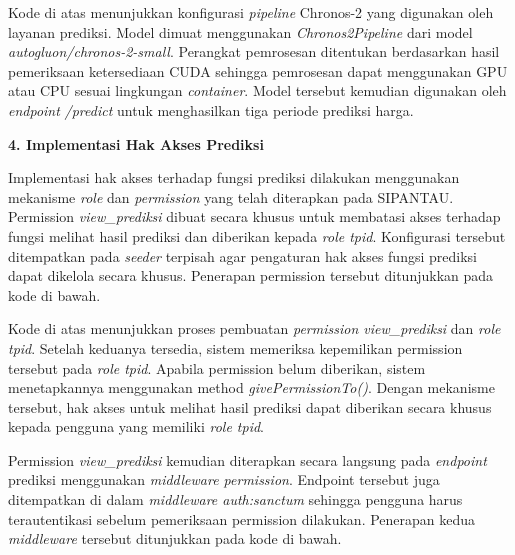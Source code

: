 Kode di atas menunjukkan konfigurasi \textit{pipeline} Chronos-2 yang digunakan oleh layanan prediksi. Model dimuat menggunakan \textit{Chronos2Pipeline} dari model \textit{autogluon/chronos-2-small}. Perangkat pemrosesan ditentukan berdasarkan hasil pemeriksaan ketersediaan CUDA sehingga pemrosesan dapat menggunakan GPU atau CPU sesuai lingkungan \textit{container}. Model tersebut kemudian digunakan oleh \textit{endpoint} \textit{/predict} untuk menghasilkan tiga periode prediksi harga.

\vspace{0.5em}
\noindent\textbf{4. Implementasi Hak Akses Prediksi}
\vspace{0.5em}

Implementasi hak akses terhadap fungsi prediksi dilakukan menggunakan mekanisme \textit{role} dan \textit{permission} yang telah diterapkan pada SIPANTAU. Permission \textit{view\_prediksi} dibuat secara khusus untuk membatasi akses terhadap fungsi melihat hasil prediksi dan diberikan kepada \textit{role tpid}. Konfigurasi tersebut ditempatkan pada \textit{seeder} terpisah agar pengaturan hak akses fungsi prediksi dapat dikelola secara khusus. Penerapan permission tersebut ditunjukkan pada kode di bawah.

\begin{code}
\end{code}

Kode di atas menunjukkan proses pembuatan \textit{permission view\_prediksi} dan \textit{role tpid}. Setelah keduanya tersedia, sistem memeriksa kepemilikan permission tersebut pada \textit{role tpid}. Apabila permission belum diberikan, sistem menetapkannya menggunakan method \textit{givePermissionTo()}. Dengan mekanisme tersebut, hak akses untuk melihat hasil prediksi dapat diberikan secara khusus kepada pengguna yang memiliki \textit{role tpid}.

Permission \textit{view\_prediksi} kemudian diterapkan secara langsung pada \textit{endpoint} prediksi menggunakan \textit{middleware permission}. Endpoint tersebut juga ditempatkan di dalam \textit{middleware auth:sanctum} sehingga pengguna harus terautentikasi sebelum pemeriksaan permission dilakukan. Penerapan kedua \textit{middleware} tersebut ditunjukkan pada kode di bawah.


